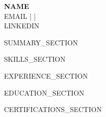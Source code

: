 \documentclass[11pt,a4paper]{article}
\begin{document}
\begin{center}
  {\LARGE\bfseries\color{headercolor} {{NAME}}} \\[4pt]
  {{EMAIL}} \enspace |  \enspace |  \\[2pt]
  {{LINKEDIN}}
\end{center}

\vspace{6pt}

{{SUMMARY_SECTION}}

{{SKILLS_SECTION}}

{{EXPERIENCE_SECTION}}

{{EDUCATION_SECTION}}

{{CERTIFICATIONS_SECTION}}
\end{document}
